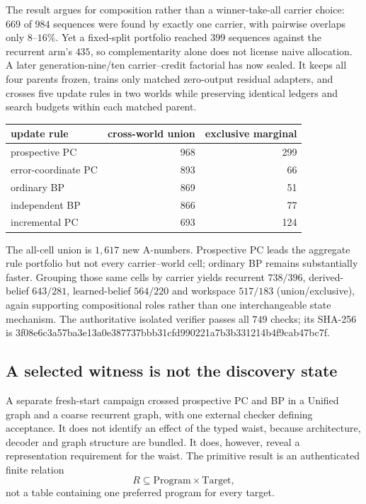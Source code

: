 \documentclass[11pt]{article}
\begin{document}
The result argues for composition rather than a winner-take-all carrier choice: $669$ of
$984$ sequences were found by exactly one carrier, with pairwise overlaps only
$8$--$16\%$. Yet a fixed-split portfolio reached $399$ sequences against the recurrent
arm's $435$, so complementarity alone does not license naive allocation. A later
generation-nine/ten carrier--credit factorial has now sealed. It keeps all four parents
frozen, trains only matched zero-output residual adapters, and crosses five update rules
in two worlds while preserving identical ledgers and search budgets within each matched
parent.

\begin{center}\small
\begin{tabular}{@{}lrr@{}}
\toprule
update rule & cross-world union & exclusive marginal \\
\midrule
prospective PC & 968 & 299 \\
error-coordinate PC & 893 & 66 \\
ordinary BP & 869 & 51 \\
independent BP & 866 & 77 \\
incremental PC & 693 & 124 \\
\bottomrule
\end{tabular}
\end{center}

The all-cell union is $1{,}617$ new A-numbers. Prospective PC leads the aggregate rule
portfolio but not every carrier--world cell; ordinary BP remains substantially faster.
Grouping those same cells by carrier yields recurrent $738/396$, derived-belief
$643/281$, learned-belief $564/220$ and workspace $517/183$ (union/exclusive), again
supporting compositional roles rather than one interchangeable state mechanism. The
authoritative isolated verifier passes all $749$ checks; its SHA-256 is
{\scriptsize\ttfamily
3f08e6c3a57ba3e13a0e387737bbb31cfd990221a7b3b331214b4f9cab47bc7f}.

\subsection{A selected witness is not the discovery state}
\label{sec:relational-discovery-state}

A separate fresh-start campaign crossed prospective PC and BP in a Unified graph and
a coarse recurrent graph, with one external checker defining acceptance. It does not
identify an effect of the typed waist, because architecture, decoder and graph structure
are bundled. It does, however, reveal a representation requirement for the waist.
The primitive result is an authenticated finite relation
\[
 R\subseteq \mathrm{Program}\times\mathrm{Target},
\]
not a table containing one preferred program for every target.
\end{document}
